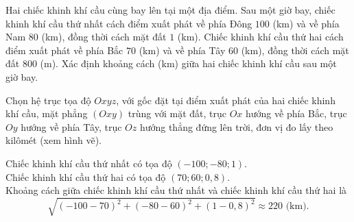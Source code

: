 \begin{ex}%
	Hai chiếc khinh khí cầu cùng bay lên tại một địa điểm. Sau một giờ bay, chiếc khinh khí cầu thứ nhất cách điểm xuất phát về phía Đông $100$ (km) và về phía Nam $80$ (km), đồng thời cách mặt đất $1$ (km). Chiếc khinh khí cầu thứ hai cách điểm xuất phát về phía Bắc $70$ (km) và về phía Tây $60$ (km), đồng thời cách mặt đất $800$ (m). Xác định khoảng cách (km) giữa hai chiếc khinh khí cầu sau một giờ bay. 
	\loigiai
	{
		Chọn hệ trục tọa độ $O x y z$, với gốc đặt tại điểm xuất phát của hai chiếc khinh khí cầu, mặt phẳng $(O x y)$ trùng với mặt đất, trục $O x$ hướng về phía Bắc, trục $O y$ hướng về phía Tây, trục $O z$ hướng thẳng đứng lên trời, đơn vị đo lấy theo kilômét (xem hình vẽ).\\
		\begin{center}
		\end{center}
		Chiếc khinh khí cầu thứ nhất có tọa độ $(-100;-80; 1)$.\\
		Chiếc khinh khí cầu thứ hai có tọa độ $(70; 60; 0{,}8)$.\\
		Khoảng cách giữa chiếc khinh khí cầu thứ nhất và chiếc khinh khí cầu thứ hai là
		$$\sqrt{(-100-70)^2+(-80-60)^2+(1-0{,}8)^2} \approx 220 \text{ (km)}.$$ 	
	}
\end{ex}

